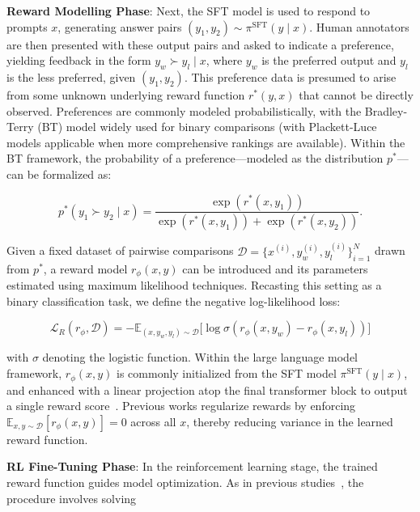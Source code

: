 \textbf{Reward Modelling Phase}: Next, the SFT model is used to respond to prompts $x$, generating answer pairs $(y_1, y_2)\sim \pi^\text{SFT}(y \mid x)$. Human annotators are then presented with these output pairs and asked to indicate a preference, yielding feedback in the form $y_w\succ y_l \mid x$, where $y_w$ is the preferred output and $y_l$ is the less preferred, given $(y_1, y_2)$. This preference data is presumed to arise from some unknown underlying reward function $r^*(y, x)$ that cannot be directly observed. Preferences are commonly modeled probabilistically, with the Bradley-Terry (BT) model \cite{bradley1952rankanalysis} widely used for binary comparisons (with Plackett-Luce models \citep{plackett1975analysis, luce2012individual} applicable when more comprehensive rankings are available). Within the BT framework, the probability of a preference—modeled as the distribution $p^*$—can be formalized as:

\begin{equation}\label{eq:bradley-terry}
    p^*(y_1\succ y_2 \mid x)=\frac{\exp\left(r^*(x, y_1)\right)}{\exp\left(r^*(x, y_1)\right) + \exp\left(r^*(x, y_2)\right)}.
\end{equation}

Given a fixed dataset of pairwise comparisons $\mathcal{D}=\bigl\{x^{(i)}, y_w^{(i)}, y_l^{(i)}\bigr\}_{i=1}^N$ drawn from $p^*$, a reward model $r_{\phi}(x, y)$ can be introduced and its parameters estimated using maximum likelihood techniques. Recasting this setting as a binary classification task, we define the negative log-likelihood loss:

\begin{equation}\label{eq:reward_model}
    \mathcal{L}_R(r_{\phi}, \mathcal{D}) = -\mathbb{E}_{(x, y_w, y_l)\sim \mathcal{D}}\bigl[\log \sigma(r_{\phi}(x, y_w)- r_{\phi}(x, y_l))\bigr]
\end{equation}

with $\sigma$ denoting the logistic function. Within the large language model framework, $r_{\phi}(x, y)$ is commonly initialized from the SFT model $\pi^\text{SFT}(y \mid x)$, and enhanced with a linear projection atop the final transformer block to output a single reward score~\cite{ziegler2020finetuning}. Previous works regularize rewards by enforcing $\mathbb{E}_{x,y\sim \mathcal{D}}\left[r_\phi(x, y)\right] = 0$ across all $x$, thereby reducing variance in the learned reward function.

\textbf{RL Fine-Tuning Phase}: In the reinforcement learning stage, the trained reward function guides model optimization. As in previous studies~\citep{jaques2017sequence, jaques2020human}, the procedure involves solving

